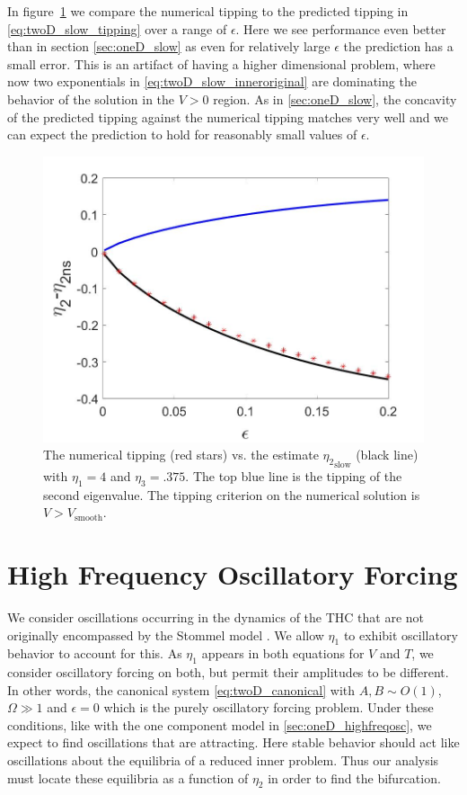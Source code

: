 \indent In figure~\ref{fig:twoD_slow_epscomp} we compare the numerical tipping to the predicted tipping in \eqref{eq:twoD_slow_tipping} over a range of $\epsilon$. Here we see performance even better than in section \autoref{sec:oneD_slow} as even for relatively large $\epsilon$ the prediction has a small error. This is an artifact of having a higher dimensional problem, where now two exponentials in \eqref{eq:twoD_slow_inneroriginal} are dominating the behavior of the solution in the $V>0$ region. As in \autoref{sec:oneD_slow}, the concavity of the predicted tipping against the numerical tipping matches very well and we can expect the prediction to hold for reasonably small values of $\epsilon$.

\begin{figure}[H]
\centering
\includegraphics[width=.7\linewidth]{twoD/slow_epscomp.jpg}
\caption{The numerical tipping (red stars) vs. the estimate ${\eta_2}_{\text{slow}}$ (black line) with $\eta_1=4$ and $\eta_3=.375$. The top blue line is the tipping of the second eigenvalue. The tipping criterion on the numerical solution is $V>V_{\text{smooth}}$.}
\label{fig:twoD_slow_epscomp}
\end{figure}

\section{High Frequency Oscillatory Forcing}
\label{sec:twoD_highfreqosc}

We consider oscillations occurring in the dynamics of the THC that are not originally encompassed by the Stommel model \cite{alley2003abrupt,huybers2005obliquity,marotzke2000abrupt,rahmstorf2000thermohaline,rahmstorf2002ocean,stastna2007box}. We allow $\eta_1$ to exhibit oscillatory behavior to account for this. As $\eta_1$ appears in both equations for $V$ and $T$, we consider oscillatory forcing on both, but permit their amplitudes to be different. In other words, the canonical system \eqref{eq:twoD_canonical} with $A,B\sim O(1)$, $\Omega\gg 1$ and $\epsilon=0$ which is the purely oscillatory forcing problem. Under these conditions, like with the one component model in \autoref{sec:oneD_highfreqosc}, we expect to find oscillations that are attracting. Here stable behavior should act like oscillations about the equilibria of a reduced inner problem. Thus our analysis must locate these equilibria as a function of $\eta_2$ in order to find the bifurcation.

